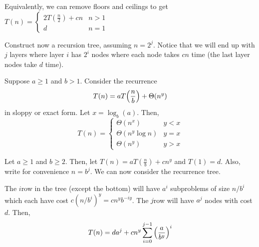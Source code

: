 Equivalently, we can  remove floors and ceilings to get $T(n) = \begin{cases}
    2T(\frac{n}{2}) + cn & n > 1 \\
    d                    & n = 1
  \end{cases}$

Construct now a recursion tree, assuming $n = 2^j$.
Notice that we will end up with $j$ layers where layer $i$ has $2^i$ nodes
where each node takes $cn$ time (the last layer nodes take $d$ time).


\begin{theorem}
  Suppose $a \geq 1$ and $b > 1$. Consider the recurrence
  \[ T(n) = a T\qty(\frac{n}{b}) + \Theta(n^y) \]
  in sloppy or exact form. Let $x = \log_b(a)$. Then,
  \[
    T(n) = \begin{cases}
      \Theta(n^x)       & y < x \\
      \Theta(n^y\log n) & y = x \\
      \Theta(n^y)       & y > x
    \end{cases}
  \]
\end{theorem}
\begin{prf}
  Let $a \geq 1$ and $b \geq 2$.
  Then, let $T(n) = aT(\frac{n}{b}) + cn^y$ and $T(1) = d$.
  Also, write for convenience $n = b^j$.
  We can now consider the recurrence tree.

  The $i$\xth row in the tree (except the bottom) will have $a^i$ subproblems
  of size $n/b^i$ which each have cost $c(n/b^i)^y = c n^y b^{-iy}$.
  The $j$\xth row will have $a^j$ nodes with cost $d$.
  Then,
  \[
    T(n) = d a^j + c n^y \sum_{i=0}^{j-1} \qty(\frac{a}{b^y})^i
  \]
\end{prf}